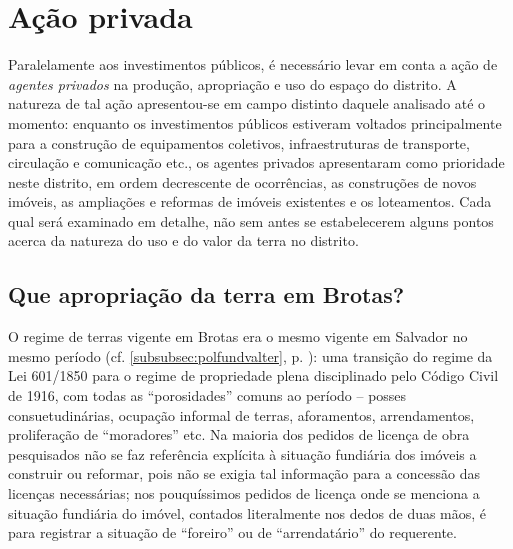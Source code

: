 \section{Ação privada}\label{sec:acaoprivada}

Paralelamente aos investimentos públicos, é necessário levar em conta a ação de \textit{agentes privados} na produção, apropriação e uso do espaço do distrito. A natureza de tal ação apresentou-se em campo distinto daquele analisado até o momento: enquanto os investimentos públicos estiveram voltados principalmente para a construção de equipamentos coletivos, infraestruturas de transporte, circulação e comunicação etc., os agentes privados apresentaram como prioridade neste distrito, em ordem decrescente de ocorrências, as construções de novos imóveis, as ampliações e reformas de imóveis existentes e os loteamentos. Cada qual será examinado em detalhe, não sem antes se estabelecerem alguns pontos acerca da natureza do uso e do valor da terra no distrito.

\subsection{Que apropriação da terra em Brotas?}\label{subsec:apropribrotas}

O regime de terras vigente em Brotas era o mesmo vigente em Salvador no mesmo período (cf. \autoref{subsubsec:polfundvalter}, p. \pageref{subsubsec:polfundvalter}): uma transição do regime da Lei 601/1850 para o regime de propriedade plena disciplinado pelo Código Civil de 1916, com todas as ``porosidades'' comuns ao período -- posses consuetudinárias, ocupação informal de terras, aforamentos, arrendamentos, proliferação de ``moradores'' etc. Na maioria dos pedidos de licença de obra pesquisados não se faz referência explícita à situação fundiária dos imóveis a construir ou reformar, pois não se exigia tal informação para a concessão das licenças necessárias; nos pouquíssimos pedidos de licença onde se menciona a situação fundiária do imóvel, contados literalmente nos dedos de duas mãos, é para registrar a situação de ``foreiro'' ou de ``arrendatário'' do requerente. 

